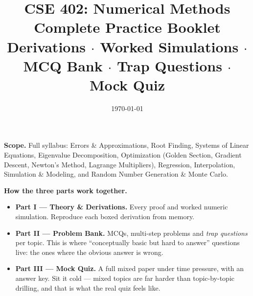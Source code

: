 \documentclass[11pt]{article}
\title{\textbf{\color{navy}CSE 402: Numerical Methods}\\[6pt]\Large\textbf{\color{gold}Complete Practice Booklet}\\[4pt]\large Derivations $\cdot$ Worked Simulations $\cdot$ MCQ Bank $\cdot$ Trap Questions $\cdot$ Mock Quiz}
\author{}
\date{\today}
\begin{document}
\maketitle

\begin{center}
\begin{minipage}{0.88\textwidth}
\begin{keypoint}
\textbf{Scope.} Full syllabus: Errors \& Approximations, Root Finding, Systems of Linear Equations, Eigenvalue Decomposition, Optimization (Golden Section, Gradient Descent, Newton's Method, Lagrange Multipliers), Regression, Interpolation, Simulation \& Modeling, and Random Number Generation \& Monte Carlo.

\textbf{How the three parts work together.}
\begin{itemize}
\item \textbf{Part I --- Theory \& Derivations.} Every proof and worked numeric simulation. Reproduce each boxed derivation from memory.
\item \textbf{Part II --- Problem Bank.} MCQs, multi-step problems and \emph{trap questions} per topic. This is where ``conceptually basic but hard to answer'' questions live: the ones where the obvious answer is wrong.
\item \textbf{Part III --- Mock Quiz.} A full mixed paper under time pressure, with an answer key. Sit it cold --- mixed topics are far harder than topic-by-topic drilling, and that is what the real quiz feels like.
\end{itemize}
\end{keypoint}
\end{minipage}
\end{center}

\tableofcontents
\newpage


\end{document}
